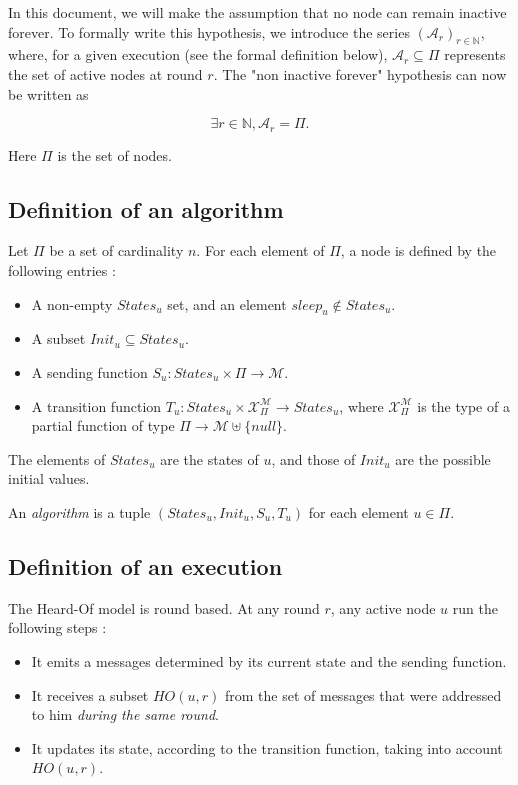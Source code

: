 \documentclass{article}
\begin{document}
In this document, we will make the assumption that no node can remain inactive forever.
To formally write this hypothesis, we introduce the series $(\mathcal{A}_r)_{r \in \mathds{N}}$, where, for a given execution (see the formal definition below), $\mathcal{A}_r \subseteq \Pi$ 
represents the set of active nodes at round $r$.
The "non inactive forever" hypothesis can now be written as

$$\exists r \in \mathds{N}, \mathcal{A}_r = \Pi.$$

Here $\Pi$ is the set of nodes.

\subsection{Definition of an algorithm}

Let $\Pi$ be a set of cardinality $n$. For each element of $\Pi$, a node is defined by the following entries :

\begin{itemize}
	\item A non-empty $States_u$ set, and an element $sleep_u \notin States_u$.
	\item A subset $Init_u \subseteq States_u$.
	\item A sending function $S_u : States_u \times \Pi \rightarrow \mathcal{M}$.
	\item A transition function $T_u : States_u \times \mathcal{X}_\Pi^{\mathcal{M}} \rightarrow States_u$,
		where $\mathcal{X}_\Pi^{\mathcal{M}}$ is the type of a partial function
		of type $\Pi \rightarrow \mathcal{M} \uplus \{null\}$.
\end{itemize}

The elements of $States_u$ are the states of $u$, and those of $Init_u$ are the possible initial values.

An \textit{algorithm} is a tuple $(States_u, Init_u, S_u, T_u)$ for each element $u \in \Pi$.


\subsection{Definition of an execution}

The Heard-Of model is round based. At any round $r$, any active node $u$ run the following steps :

\begin{itemize}
	\item It emits a messages determined by its current state and the sending function.
	\item It receives a subset $HO(u,r)$ from the set of messages that were addressed to him
		\textit{during the same round}.
	\item It updates its state, according to the transition function, taking into account $HO(u,r)$.
\end{itemize}
\end{document}
